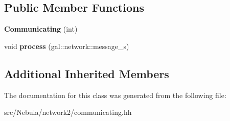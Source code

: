 \subsection*{Public Member Functions}
\begin{DoxyCompactItemize}
\item 
\hypertarget{classNeb_1_1Network_1_1Communicating_a49209dffa98203430d9c27d06bf2f20e}{{\bfseries Communicating} (int)}\label{classNeb_1_1Network_1_1Communicating_a49209dffa98203430d9c27d06bf2f20e}

\item 
\hypertarget{classNeb_1_1Network_1_1Communicating_accb7cece4006dabcb09bea96bd728175}{void {\bfseries process} (gal\-::network\-::message\-\_\-s)}\label{classNeb_1_1Network_1_1Communicating_accb7cece4006dabcb09bea96bd728175}

\end{DoxyCompactItemize}
\subsection*{Additional Inherited Members}


The documentation for this class was generated from the following file\-:\begin{DoxyCompactItemize}
\item 
src/\-Nebula/network2/communicating.\-hh\end{DoxyCompactItemize}
